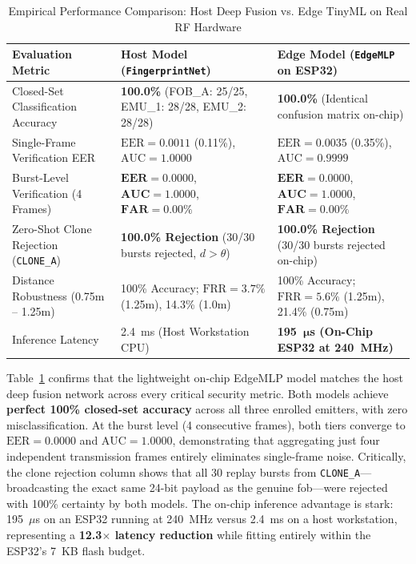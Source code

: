 \documentclass[11pt,a4paper]{article}
\begin{document}
\begin{table}[htbp]
\centering
\small
\caption{Empirical Performance Comparison: Host Deep Fusion vs. Edge TinyML on Real RF Hardware}
\label{tab:performance}
\begin{tabularx}{\textwidth}{l X X}
\toprule
\textbf{Evaluation Metric} & \textbf{Host Model (\texttt{FingerprintNet})} & \textbf{Edge Model (\texttt{EdgeMLP} on ESP32)} \\
\midrule
Closed-Set Classification Accuracy & \textbf{100.0\%} (FOB\_A: 25/25, EMU\_1: 28/28, EMU\_2: 28/28) & \textbf{100.0\%} (Identical confusion matrix on-chip) \\
Single-Frame Verification EER & $\text{EER} = 0.0011$ (0.11\%), $\text{AUC} = 1.0000$ & $\text{EER} = 0.0035$ (0.35\%), $\text{AUC} = 0.9999$ \\
Burst-Level Verification (4 Frames) & $\mathbf{EER = 0.0000}$, $\mathbf{AUC = 1.0000}$, $\mathbf{FAR = 0.00\%}$ & $\mathbf{EER = 0.0000}$, $\mathbf{AUC = 1.0000}$, $\mathbf{FAR = 0.00\%}$ \\
Zero-Shot Clone Rejection (\texttt{CLONE\_A}) & \textbf{100.0\% Rejection} (30/30 bursts rejected, $d > \theta$) & \textbf{100.0\% Rejection} (30/30 bursts rejected on-chip) \\
Distance Robustness (0.75m -- 1.25m) & 100\% Accuracy; $\text{FRR} = 3.7\%$ (1.25m), 14.3\% (1.0m) & 100\% Accuracy; $\text{FRR} = 5.6\%$ (1.25m), 21.4\% (0.75m) \\
Inference Latency & 2.4~ms (Host Workstation CPU) & \textbf{195~$\boldsymbol{\mu}$s (On-Chip ESP32 at 240~MHz)} \\
\bottomrule
\end{tabularx}
\end{table}

\noindent Table~\ref{tab:performance} confirms that the lightweight on-chip EdgeMLP model matches the host deep fusion network across every critical security metric. Both models achieve \textbf{perfect 100\% closed-set accuracy} across all three enrolled emitters, with zero misclassification. At the burst level (4 consecutive frames), both tiers converge to $\text{EER} = 0.0000$ and $\text{AUC} = 1.0000$, demonstrating that aggregating just four independent transmission frames entirely eliminates single-frame noise. Critically, the clone rejection column shows that all 30 replay bursts from \texttt{CLONE\_A}—broadcasting the exact same 24-bit payload as the genuine fob—were rejected with 100\% certainty by both models. The on-chip inference advantage is stark: 195~$\mu$s on an ESP32 running at 240~MHz versus 2.4~ms on a host workstation, representing a \textbf{12.3$\times$ latency reduction} while fitting entirely within the ESP32's 7~KB flash budget.
\end{document}
